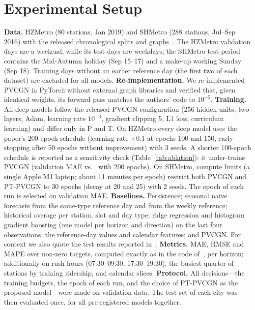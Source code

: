 \documentclass[journal]{IEEEtran}
\begin{document}
\section{Experimental Setup}
\textbf{Data.} HZMetro (80 stations, Jan 2019) and SHMetro (288 stations, Jul--Sep 2016) with the released chronological splits and graphs~\cite{liu2022pvcgn}. The HZMetro validation days are a weekend, while its test days are weekdays; the SHMetro test period contains the Mid-Autumn holiday (Sep 15--17) and a make-up working Sunday (Sep 18). Training days without an earlier reference day (the first two of each dataset) are excluded for all models.
\textbf{Re-implementation.} We re-implemented PVCGN in PyTorch without external graph libraries and verified that, given identical weights, its forward pass matches the authors' code to $10^{-5}$.
\textbf{Training.} All deep models follow the released PVCGN configuration (256 hidden units, two layers, Adam, learning rate $10^{-3}$, gradient clipping 5, L1 loss, curriculum learning) and differ only in P and T. On HZMetro every deep model uses the paper's 200-epoch schedule (learning rate $\times0.1$ at epochs 100 and 150, early stopping after 50 epochs without improvement) with 3 seeds. A shorter 100-epoch schedule is reported as a sensitivity check (Table~\ref{tab:ablation}): it under-trains PVCGN (validation MAE \hzPVvalHund{} vs.\ \hzPVval{} with 200 epochs). On SHMetro, compute limits (a single Apple M1 laptop; about 11 minutes per epoch) restrict both PVCGN and PT-PVCGN to 30 epochs (decay at 20 and 25) with 2 seeds. The epoch of each run is selected on validation MAE.
\textbf{Baselines.} Persistence; seasonal naive forecasts from the same-type reference day and from the weekly reference; historical average per station, slot and day type; ridge regression and histogram gradient boosting (one model per horizon and direction) on the last four observations, the reference-day values and calendar features; and PVCGN. For context we also quote the test results reported in~\cite{liu2022pvcgn}.
\textbf{Metrics.} MAE, RMSE and MAPE over non-zero targets, computed exactly as in the code of~\cite{liu2022pvcgn}, per horizon; additionally on rush hours (07:30--09:30, 17:30--19:30), the busiest quarter of stations by training ridership, and calendar slices.
\textbf{Protocol.} All decisions---the training budgets, the epoch of each run, and the choice of PT-PVCGN as the proposed model---were made on validation data. The test set of each city was then evaluated once, for all pre-registered models together.
\end{document}
